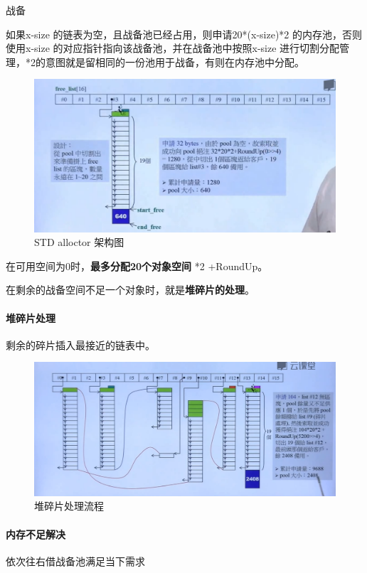 \documentclass[UTF8,a4paper,12pt]{ctexbook}
\begin{document}
			战备
			
			如果x-size 的链表为空，且战备池已经占用，则申请20*(x-size)*2 的内存池，否则使用x-size 的对应指针指向该战备池，并在战备池中按照x-size 进行切割分配管理，*2的意图就是留相同的一份池用于战备，有则在内存池中分配。 
	
			\begin{figure}[H]
				\centering
				\includegraphics[scale=0.4]{STD_arc.png}
				\caption{STD alloctor 架构图}
			\end{figure}
			
		
			在可用空间为0时，\textbf{最多分配20个对象空间 }*2 +RoundUp。
		
			在剩余的战备空间不足一个对象时，就是\textbf{堆碎片的处理}。
		
		\paragraph{堆碎片处理}
			剩余的碎片插入最接近的链表中。
			
			\begin{figure}[H]
				\centering
				\includegraphics[scale=0.37]{headFragment.png}
				\caption{堆碎片处理流程}
			\end{figure}
		
		
		\paragraph{内存不足解决}
			依次往右借战备池满足当下需求
				
\end{document}

